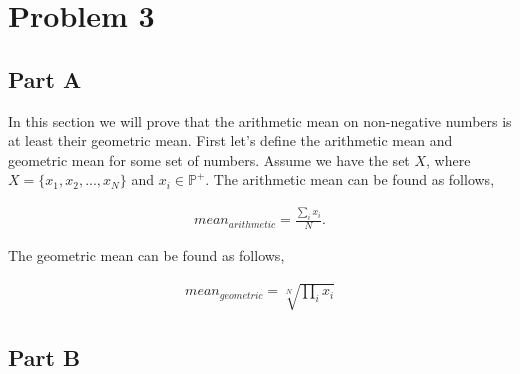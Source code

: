 \documentclass[paper=a4, fontsize=11pt]{scrartcl} %
\begin{document}
\section{Problem 3}

\subsection{Part A}
In this section we will prove that the arithmetic mean on non-negative numbers is at least their geometric mean.
First let's define the arithmetic mean and geometric mean for some set of numbers.  
Assume we have the set $X$, where $X = \{x_1,x_2,...,x_N\} $ and $ x_i \in \mathbb{P}^+$.
The arithmetic mean can be found as follows, 

\begin{align}
mean_{arithmetic} = \frac{\sum_i x_i}{N}.
\end{align}

The geometric mean can be found as follows,

\begin{align}
mean_{geometric} = \sqrt[N]{\prod_i x_i}
\end{align}

\subsection{Part B}
\end{document}
